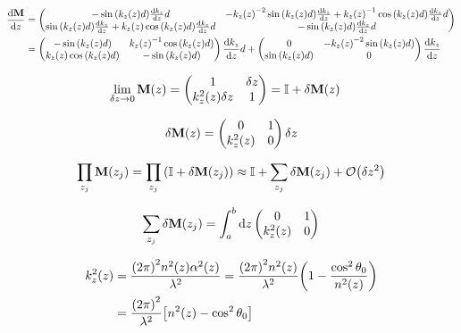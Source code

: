 \begin{align*}
	\dv{\vb{M}}{z}
		&= \pmqty{
		-\sin\pqty{k_{z}\pqty{z}d}\dv{k_{z}}{z}d & 
		-k_{z}\pqty{z}^{-2}\sin\pqty{k_{z}\pqty{z}d}\dv{k_{z}}{z}  + k_{z}\pqty{z}^{-1}\cos\pqty{k_{z}\pqty{z}d}\dv{k_{z}}{z}d \\
		\sin\pqty{k_{z}\pqty{z}d}\dv{k_{z}}{z} + k_{z}\pqty{z}\cos\pqty{k_{z}\pqty{z}d}\dv{k_{z}}{z}d &
		-\sin\pqty{k_{z}\pqty{z}d}\dv{k_{z}}{z}d
		} \\
		&= \pmqty{
		-\sin\pqty{k_{z}\pqty{z}d} & 
		k_{z}\pqty{z}^{-1}\cos\pqty{k_{z}\pqty{z}d} \\
		k_{z}\pqty{z}\cos\pqty{k_{z}\pqty{z}d} &
		-\sin\pqty{k_{z}\pqty{z}d}
		}\dv{k_{z}}{z}d + \pmqty{
		0 & 
		-k_{z}\pqty{z}^{-2}\sin\pqty{k_{z}\pqty{z}d} \\
		\sin\pqty{k_{z}\pqty{z}d} &
		0
		}\dv{k_{z}}{z}
\end{align*}

\begin{align*}
	\lim_{\delta z \to 0}\vb{M}\pqty{z}
		&= \pmqty{
		1 & 
		\delta z \\
		k_{z}^2\pqty{z}\delta z &
		1
		} = \mathbb{I} + \delta\vb{M}\pqty{z}
\end{align*}

\begin{align*}
	\delta\vb{M}\pqty{z} = \pmqty{
		0 & 
		1 \\
		k_{z}^2\pqty{z} &
		0
		}\delta z
\end{align*}

\begin{align*}
	\prod_{z_j }\vb{M}\pqty{z_j} = \prod_{z_j} \pqty{\mathbb{I} + \delta\vb{M}\pqty{z_j}} \approx \mathbb{I} + \sum_{z_j}\delta\vb{M}\pqty{z_j} + \mathcal{O}\pqty{\delta z^2}
\end{align*}

\begin{align*}
	\sum_{z_j}\delta\vb{M}\pqty{z_j} = \int_a^b \dd{z} \pmqty{0 & 1 \\ k_{z}^2\pqty{z} & 0}
\end{align*}

\begin{align*}
	k_z^2\pqty{z} &= \frac{\pqty{2\pi}^2n^2\pqty{z}\alpha^2\pqty{z}}{\lambda^2} = \frac{\pqty{2\pi}^2n^2\pqty{z}}{\lambda^2}\pqty{1 - \frac{\cos^2\theta_0}{n^2\pqty{z}}} \\
	&= \frac{\pqty{2\pi}^2}{\lambda^2}\bqty{n^2\pqty{z} - \cos^2\theta_0 }
\end{align*}

